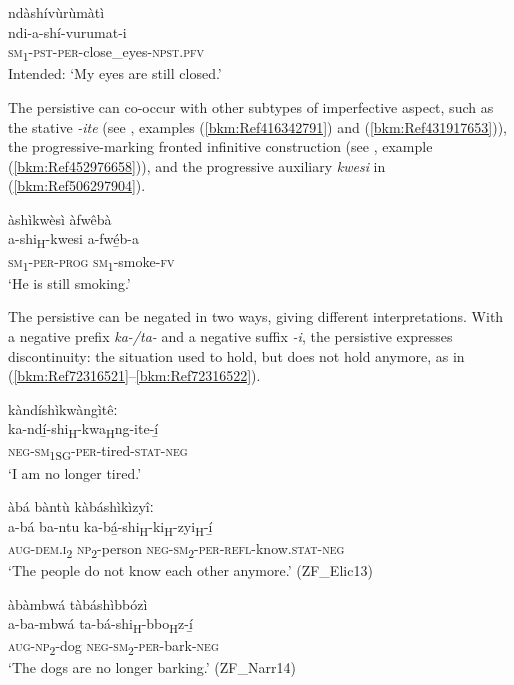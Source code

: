 \ea
\label{bkm:Ref492375627}
\glll *ndàshívùrùmàtì\\
ndi-a-shí-vurumat-i\\
\textsc{sm}\textsubscript{1}-\textsc{pst}-\textsc{per}-close\_eyes-\textsc{npst}.\textsc{pfv}\\
\glt Intended: ‘My eyes are still closed.’
\z

The persistive can co-occur with other subtypes of imperfective aspect, such as the stative \textit{-ite} (see , examples (\ref{bkm:Ref416342791}) and (\ref{bkm:Ref431917653})), the progressive-marking fronted infinitive construction (see , example (\ref{bkm:Ref452976658})), and the progressive auxiliary \textit{kwesi} in (\ref{bkm:Ref506297904}).

\ea
\label{bkm:Ref506297904}
àshìkwèsì àfwêbà\\
\gll a-shi\textsubscript{H}-kwesi    a-fwé̲b-a\\
\textsc{sm}\textsubscript{1}-\textsc{per}-\textsc{prog}  \textsc{sm}\textsubscript{1}-smoke-\textsc{fv}\\
\glt ‘He is still smoking.’
\z

The persistive can be negated in two ways, giving different interpretations. With a negative prefix \textit{ka-/ta-} and a negative suffix \textit{-i}, the persistive expresses discontinuity: the situation used to hold, but does not hold anymore, as in (\ref{bkm:Ref72316521}--\ref{bkm:Ref72316522}).

\ea
\label{bkm:Ref72316521}
kàndíshìkwàngìtêː\\
\gll ka-ndí̲-shi\textsubscript{H}-kwa\textsubscript{H}ng-ite-í̲\\
\textsc{neg}-\textsc{sm}\textsubscript{1SG}-\textsc{per}-tired-\textsc{stat}-\textsc{neg}\\
\glt ‘I am no longer tired.’
\z

\ea
àbá bàntù kàbáshìkìzyîː\\
\gll a-bá    ba-ntu  ka-bá̲-shi\textsubscript{H}-ki\textsubscript{H}-zyi\textsubscript{H}-í̲\\
\textsc{aug}-\textsc{dem}.\textsc{i}\textsubscript{2}  \textsc{np}\textsubscript{2}-person  \textsc{neg}-\textsc{sm}\textsubscript{2}-\textsc{per}-\textsc{refl}-know.\textsc{stat}-\textsc{neg}\\
\glt ‘The people do not know each other anymore.’ (ZF\_Elic13)
\z

\ea
\label{bkm:Ref72316522}
àbàmbwá tàbáshìbbózì\\
\gll a-ba-mbwá    ta-bá-shi\textsubscript{H}-bbo\textsubscript{H}z-í̲\\
\textsc{aug}-\textsc{np}\textsubscript{2}-dog    \textsc{neg}-\textsc{sm}\textsubscript{2}-\textsc{per}-bark-\textsc{neg}\\
\glt ‘The dogs are no longer barking.’ (ZF\_Narr14)
\z

